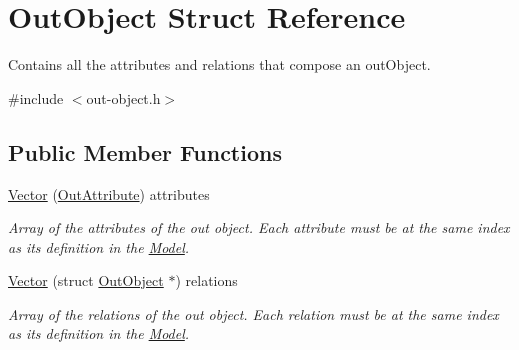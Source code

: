 \hypertarget{struct_out_object}{}\section{Out\+Object Struct Reference}
\label{struct_out_object}


Contains all the attributes and relations that compose an out\+Object.  




{\ttfamily \#include $<$out-\/object.\+h$>$}

\subsection*{Public Member Functions}
\begin{DoxyCompactItemize}
\item 
\hyperlink{struct_out_object_af88d1854d9bd41f4b23c498950c5fbca}{Vector} (\hyperlink{struct_out_attribute}{Out\+Attribute}) attributes\hypertarget{struct_out_object_af88d1854d9bd41f4b23c498950c5fbca}{}\label{struct_out_object_af88d1854d9bd41f4b23c498950c5fbca}

\begin{DoxyCompactList}\small\item\em Array of the attributes of the out object. Each attribute must be at the same index as its definition in the \hyperlink{struct_model}{Model}. \end{DoxyCompactList}\item 
\hyperlink{struct_out_object_a8f63c22191eb49ccaf964d74d27e42de}{Vector} (struct \hyperlink{struct_out_object}{Out\+Object} $\ast$) relations\hypertarget{struct_out_object_a8f63c22191eb49ccaf964d74d27e42de}{}\label{struct_out_object_a8f63c22191eb49ccaf964d74d27e42de}

\begin{DoxyCompactList}\small\item\em Array of the relations of the out object. Each relation must be at the same index as its definition in the \hyperlink{struct_model}{Model}. \end{DoxyCompactList}\end{DoxyCompactItemize}
